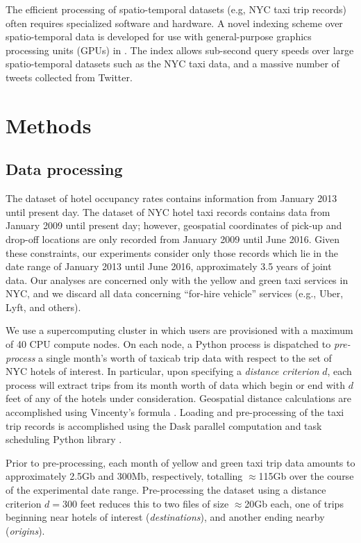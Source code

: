 \documentclass[useAMS, referee, usenatbib]{biom}
\begin{document}
The efficient processing of spatio-temporal datasets (e.g, NYC taxi trip records) often requires specialized software and hardware. A novel indexing scheme over spatio-temporal data is developed for use with general-purpose graphics processing units (GPUs) in \citet{Doraiswamy2016AGI}. The index allows sub-second query speeds over large spatio-temporal datasets such as the NYC taxi data, and a massive number of tweets collected from Twitter.

\section{Methods}
\label{s:methods}

\subsection{Data processing}

The dataset of hotel occupancy rates contains information from January 2013 until present day. The dataset of NYC hotel taxi records contains data from January 2009 until present day; however, geospatial coordinates of pick-up and drop-off locations are only recorded from January 2009 until June 2016. Given these constraints, our experiments consider only those records which lie in the date range of January 2013 until June 2016, approximately 3.5 years of joint data. Our analyses are concerned only with the yellow and green taxi services in NYC, and we discard all data concerning ``for-hire vehicle'' services (e.g., Uber, Lyft, and others).

We use a supercomputing cluster in which users are provisioned with a maximum of 40 CPU compute nodes. On each node, a Python process is dispatched to \textit{pre-process} a single month's worth of taxicab trip data with respect to the set of NYC hotels of interest. In particular, upon specifying a \textit{distance criterion} $d$, each process will extract trips from its month worth of data which begin or end with $d$ feet of any of the hotels under consideration. Geospatial distance calculations are accomplished using Vincenty's formula \citep{bessel_calculation_2010}. Loading and pre-processing of the taxi trip records is accomplished using the Dask parallel computation and task scheduling Python library \cite{dask}.

Prior to pre-processing, each month of yellow and green taxi trip data amounts to approximately 2.5Gb and 300Mb, respectively, totalling $\approx$115Gb over the course of the experimental date range. Pre-processing the dataset using a distance criterion $d = 300$ feet reduces this to two files of size $\approx$20Gb each, one of trips beginning near hotels of interest (\textit{destinations}), and another ending nearby (\textit{origins}).
\end{document}
